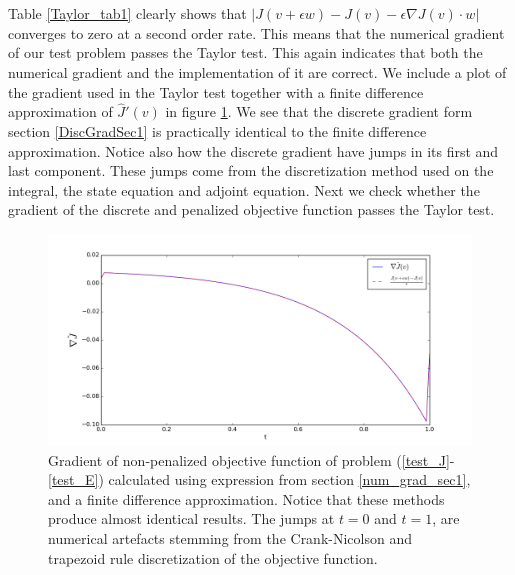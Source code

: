 \\
\\
Table \ref{Taylor_tab1} clearly shows that $|J(v+\epsilon w)-J(v)-\epsilon \nabla J(v)\cdot w|$ converges to zero at a second order rate. This means that the numerical gradient of our test problem passes the Taylor test. This again indicates that both the numerical gradient and the implementation of it are correct. We include a plot of the gradient used in the Taylor test together with a finite difference approximation of $\hat J'(v)$ in figure \ref{JGrad1}. We see that the discrete gradient form section \ref{DiscGradSec1} is practically identical to the finite difference approximation. Notice also how the discrete gradient have jumps in its first and last component. These jumps come from the discretization method used on the integral, the state equation and adjoint equation. Next we check whether the gradient of the discrete and penalized objective function passes the Taylor test.
\begin{figure}[h]
\centering
\includegraphics[scale=0.5]{num_grad.png}
\caption{Gradient of non-penalized objective function of problem (\ref{test_J}-\ref{test_E}) calculated using expression from section \ref{num_grad_sec1}, and a finite difference approximation. Notice that these methods produce almost identical results. The jumps at $t=0$ and $t=1$, are numerical artefacts stemming from the Crank-Nicolson and trapezoid rule discretization of the objective function.}
\label{JGrad1}
\end{figure}
